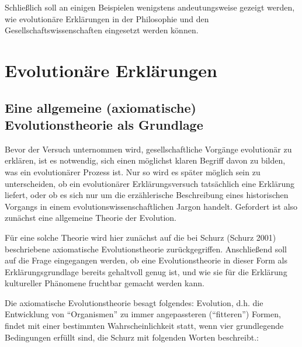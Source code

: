 \documentclass[12pt,a4paper,ngerman]{article}
\begin{document}
Schließlich soll an einigen Beispielen wenigstens andeutungsweise
gezeigt werden, wie evolutionäre Erklärungen in der Philosophie und
den Gesellschaftswissenschaften eingesetzt werden können.


\section{Evolutionäre Erklärungen}

\subsection{Eine allgemeine (axiomatische) Evolutionstheorie als Grundlage}

Bevor der Versuch unternommen wird, gesellschaftliche Vorgänge
evolutionär zu erklären, ist es notwendig, sich einen möglichst klaren
Begriff davon zu bilden, was ein evolutionärer Prozess ist. Nur so
wird es später möglich sein zu unterscheiden, ob ein evolutionärer
Erklärungsversuch tatsächlich eine Erklärung liefert, oder ob es sich
nur um die erzählerische Beschreibung eines historischen Vorgangs in
einem evolutionswissenschaftlichen Jargon handelt. Gefordert ist also
zunächst eine allgemeine Theorie der Evolution.


Für eine solche Theorie wird hier zunächst auf die bei Schurz (Schurz 2001)
beschriebene axiomatische Evolutionstheorie
zurückgegriffen. Anschließend soll auf die Frage eingegangen werden, ob
eine Evolutionstheorie in dieser Form als Erklärungsgrundlage bereits
gehaltvoll genug ist, und wie sie für die Erklärung kultureller
Phänomene fruchtbar gemacht werden kann.

Die axiomatische Evolutionstheorie besagt folgendes: Evolution, d.h. die
Entwicklung von "`Organismen"' zu immer angepassteren ("`fitteren"') Formen,
findet mit einer bestimmten Wahrscheinlichkeit statt, wenn vier grundlegende
Bedingungen erfüllt sind, die Schurz mit folgenden Worten beschreibt.:
\end{document}
